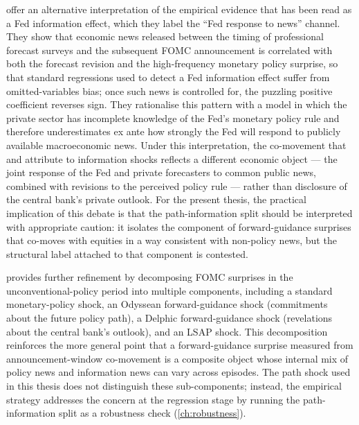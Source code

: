 \citet{bauerSwanson2023} offer an alternative interpretation of the
empirical evidence that has been read as a Fed information effect,
which they label the ``Fed response to news'' channel. They show
that economic news released between the timing of professional
forecast surveys and the subsequent FOMC announcement is correlated
with both the forecast revision and the high-frequency monetary
policy surprise, so that standard regressions used to detect a Fed
information effect suffer from omitted-variables bias; once such
news is controlled for, the puzzling positive coefficient reverses
sign. They rationalise this pattern with a model in which the
private sector has incomplete knowledge of the Fed's monetary policy
rule and therefore underestimates ex ante how strongly the Fed will
respond to publicly available macroeconomic news. Under this
interpretation, the co-movement that \citet{nakamuraSteinsson2018}
and \citet{jarocinskiKaradi2020} attribute to information shocks
reflects a different economic object --- the joint response of the
Fed and private forecasters to common public news, combined with
revisions to the perceived policy rule --- rather than disclosure of
the central bank's private outlook. For the present thesis, the
practical implication of this debate is that the path-information
split should be interpreted with appropriate caution: it isolates
the component of forward-guidance surprises that co-moves with
equities in a way consistent with non-policy news, but the
structural label attached to that component is contested.

\citet{jarocinski2024} provides further refinement by decomposing FOMC
surprises in the unconventional-policy period into multiple components,
including a standard monetary-policy shock, an Odyssean forward-guidance
shock (commitments about the future policy path), a Delphic forward-guidance
shock (revelations about the central bank's outlook), and an LSAP shock.
This decomposition reinforces the more general point that a
forward-guidance surprise measured from announcement-window co-movement
is a composite object whose internal mix of policy news and information
news can vary across episodes. The path shock used in this thesis
\citep{swanson2021} does not distinguish these sub-components; instead,
the empirical strategy addresses the concern at the regression stage by
running the path-information split as a robustness check
(\cref{ch:robustness}).

